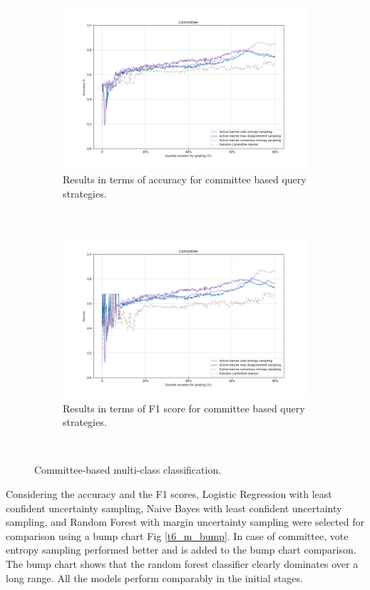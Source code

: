 	
	\begin{figure}[!htb]
		\begin{subfigure}[b]{0.5\textwidth}
			\includegraphics[width=\textwidth]{images/task6_accuracy_com}
			\caption{Results in terms of accuracy for committee based query strategies.}
			\label{t6_m_com}
		\end{subfigure}
		~
		\begin{subfigure}[b]{0.5\textwidth}
			\includegraphics[width=\textwidth]{images/task6_f1score_com}
			\caption{Results in terms of F1 score for committee based query strategies.}
			\label{t6_m_com_f1}
		\end{subfigure}
		~
		\caption{Committee-based multi-class classification.}
	\end{figure}
	
	Considering the accuracy and the F1 scores, Logistic Regression with least confident uncertainty sampling, Naive Bayes with least confident uncertainty sampling, and Random Forest with margin uncertainty sampling were selected for comparison using a bump chart Fig \ref{t6_m_bump}. In case of committee, vote entropy sampling performed better and is added to the bump chart comparison. The bump chart shows that the random forest classifier clearly dominates over a long range. All the models perform comparably in the initial stages.
	
